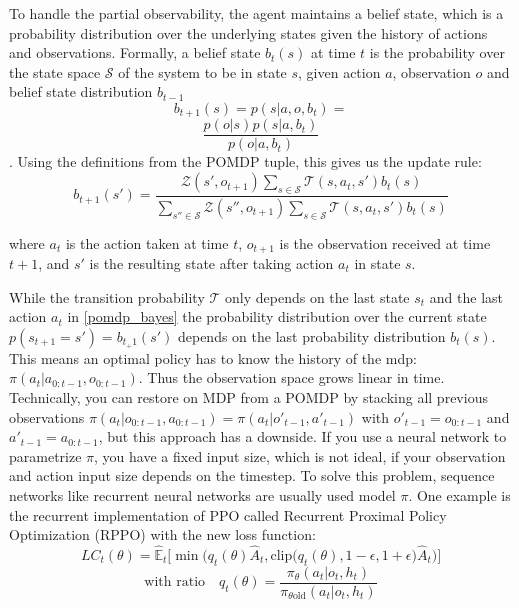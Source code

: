 To handle the partial observability, the agent maintains a belief state, which is a probability distribution over the underlying states given the history of 
actions and observations. Formally, a belief state $b_t(s)$ at time $t$ is the probability over the state space $\mathcal{S}$ of the system to be in state $s$, 
given action $a$, observation $o$ and belief state distribution $b_{t-1}$
\begin{equation*}
    b_{t+1}(s) = p(s|a,o,b_{t}) = 
\end{equation*}
\begin{equation*}
    \frac{p(o|s) p(s|a,b_{t})}{p(o|a,b_{t})}
\end{equation*}
. Using the definitions from the POMDP tuple, this gives us the update rule:
\begin{equation}
    \label{pomdp_bayes}
b_{t+1}(s') = \frac{\mathcal{Z}(s', o_{t+1}) \sum_{s \in \mathcal{S}} \mathcal{T}(s, a_t, s') b_t(s)}{\sum_{s'' \in \mathcal{S}} \mathcal{Z}(s'', o_{t+1}) \sum_{s \in \mathcal{S}} \mathcal{T}(s, a_t, s') b_t(s)}
\end{equation}

where $a_t$ is the action taken at time $t$, $o_{t+1}$ is the observation received at time $t+1$, and $s'$ is the resulting state after taking action $a_t$ in state $s$.

While the transition probability $\mathcal{T}$ only depends on the last state $s_t$ and the last action $a_t$ 
in \ref{pomdp_bayes} the probability distribution over the current state $p(s_{t+1} = s') = b_{t_+1}(s')$ depends on the last probability distribution $b_{t}(s)$.
This means an optimal policy has to know the history of the mdp: $\pi(a_t|a_{0:t-1}, o_{0:t-1})$. Thus the observation space grows linear in time. \\
Technically, you can restore on MDP from a POMDP by stacking all previous observations $\pi(a_t|o_{0:t-1}, a_{0:t-1}) = \pi(a_t|o'_{t-1}, a'_{t-1})$ 
with $o'_{t-1} = o_{0:t-1}$ and $a'_{t-1} = a_{0:t-1}$, but this approach has a downside. If you use a neural network to parametrize $\pi$, you have 
a fixed input size, which is not ideal, if your observation and action input size depends on the timestep. To solve this problem, sequence networks like 
recurrent neural networks are usually used model $\pi$. One example is the recurrent implementation of PPO called Recurrent Proximal Policy Optimization (RPPO) 
\cite{RPPO} with the new loss function:
\begin{equation}
    LC_t(\theta) = \widehat{\mathbb{E}}_t\big[\min\big(q_t(\theta)\widehat{A}_t, \text{clip}\big(q_t(\theta), 1 - \epsilon, 1 + \epsilon\big)\widehat{A}_t\big)\big] \tag{1}
\end{equation}
\begin{equation*}
    \text{with ratio} \quad q_t(\theta) = \frac{\pi_{\theta}(a_t \vert o_t, h_t)}{\pi_{\theta \text{old}}(a_t \vert o_t, h_t)}
\end{equation*}

